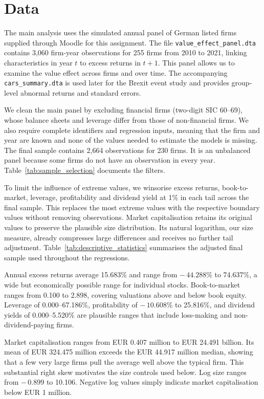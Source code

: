 \section*{Data}

The main analysis uses the simulated annual panel of German listed firms supplied through Moodle for this assignment. The file \nolinkurl{value_effect_panel.dta} contains 3,060 firm-year observations for 255 firms from 2010 to 2021, linking characteristics in year \(t\) to excess returns in \(t+1\). This panel allows us to examine the value effect across firms and over time. The accompanying \nolinkurl{cars_summary.dta} is used later for the Brexit event study and provides group-level abnormal returns and standard errors.

We clean the main panel by excluding financial firms (two-digit SIC 60--69), whose balance sheets and leverage differ from those of non-financial firms. We also require complete identifiers and regression inputs, meaning that the firm and year are known and none of the values needed to estimate the models is missing. The final sample contains 2,664 observations for 230 firms. It is an unbalanced panel because some firms do not have an observation in every year. Table~\ref{tab:sample_selection} documents the filters.



To limit the influence of extreme values, we winsorise excess returns, book-to-market, leverage, profitability and dividend yield at 1\% in each tail across the final sample. This replaces the most extreme values with the respective boundary values without removing observations. Market capitalisation retains its original values to preserve the plausible size distribution. Its natural logarithm, our size measure, already compresses large differences and receives no further tail adjustment. Table~\ref{tab:descriptive_statistics} summarises the adjusted final sample used throughout the regressions.



Annual excess returns average 15.683\% and range from $-\,44.288\%$ to 74.637\%, a wide but economically possible range for individual stocks. Book-to-market ranges from 0.100 to 2.898, covering valuations above and below book equity. Leverage of 0.000--67.186\%, profitability of $-\,10.608\%$ to 25.816\%, and dividend yields of 0.000--5.520\% are plausible ranges that include loss-making and non-dividend-paying firms.

Market capitalisation ranges from EUR 0.407 million to EUR 24.491 billion. Its mean of EUR 324.475 million exceeds the EUR 44.917 million median, showing that a few very large firms pull the average well above the typical firm. This substantial right skew motivates the size controls used below. Log size ranges from $-\,0.899$ to 10.106. Negative log values simply indicate market capitalisation below EUR 1 million.
